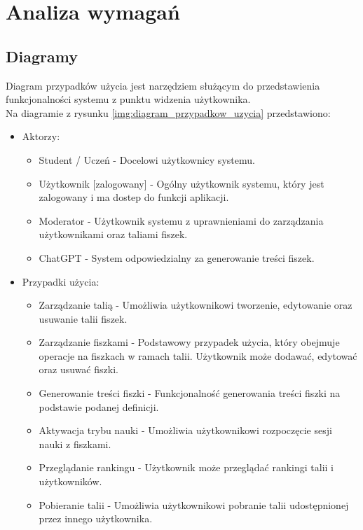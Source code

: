 \newapage
\chapter{Analiza wymagań}

\section{Diagramy}

\setlength{\parindent}{15pt}

\indent Diagram przypadków użycia jest narzędziem służącym do przedstawienia funkcjonalności systemu z punktu widzenia użytkownika. \\
Na diagramie z rysunku \ref{img:diagram_przypadkow_uzycia} przedstawiono:
\begin{itemize}
    \item Aktorzy:
    \begin{itemize}
              \item Student / Uczeń - Docelowi użytkownicy systemu.
        \item Użytkownik [zalogowany] - Ogólny użytkownik systemu, który jest zalogowany i ma dostep do funkcji aplikacji.
        \item Moderator - Użytkownik systemu z uprawnieniami do zarządzania użytkownikami oraz taliami fiszek.
        \item ChatGPT - System odpowiedzialny za generowanie treści fiszek.
    \end{itemize}
    \item Przypadki użycia: \begin{itemize}
                                \item Zarządzanie talią - Umożliwia użytkownikowi tworzenie, edytowanie oraz usuwanie talii fiszek.
                                \item Zarządzanie fiszkami - Podstawowy przypadek użycia, który obejmuje operacje na fiszkach w ramach talii. Użytkownik może dodawać, edytować oraz usuwać fiszki.
                                \item Generowanie treści fiszki - Funkcjonalność generowania treści fiszki na podstawie podanej definicji.
                                \item Aktywacja trybu nauki - Umożliwia użytkownikowi rozpoczęcie sesji nauki z fiszkami.
                                \item Przeglądanie rankingu - Użytkownik może przeglądać rankingi talii i użytkowników.
                                \item Pobieranie talii - Umożliwia użytkownikowi pobranie talii udostępnionej przez innego użytkownika.

\end{itemize}
\end{itemize}
